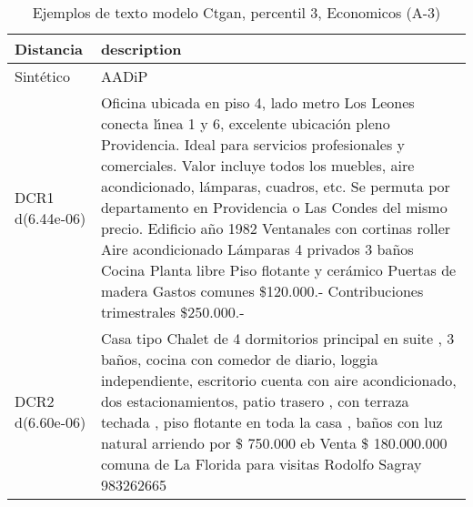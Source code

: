 \begin{table}[H]
\centering
\fontsize{10}{14}\selectfont
\caption{Ejemplos de texto modelo Ctgan, percentil 3, Economicos (A-3)}
\label{table-example-economicos-a-3-ctgan-3p-text}
\begin{tabular}{|l|m{35em}|}
\hline
\rowcolor[gray]{0.8}
Distancia & description \\
\hline Sintético & AADiP \\
\hline DCR1 d(6.44e-06) & Oficina ubicada en piso 4, lado metro Los Leones conecta l{\'\i}nea 1 y 6, excelente ubicaci\'on pleno Providencia. Ideal para servicios profesionales y comerciales. Valor incluye todos los muebles, aire acondicionado, l\'amparas, cuadros, etc.  Se permuta por departamento en Providencia o Las Condes del mismo precio.  Edificio a\~no 1982 Ventanales con cortinas roller Aire acondicionado L\'amparas 4 privados 3 ba\~nos Cocina Planta libre Piso flotante y cer\'amico Puertas de madera Gastos comunes \$120.000.- Contribuciones trimestrales \$250.000.- \\
\hline DCR2 d(6.60e-06) & Casa tipo Chalet de 4 dormitorios principal en suite , 3 ba\~nos, cocina con comedor de diario, loggia independiente, escritorio cuenta con aire acondicionado, dos estacionamientos, patio trasero , con terraza techada , piso flotante en toda la casa , ba\~nos con luz natural arriendo por \$ 750.000 eb Venta \$ 180.000.000 comuna de La Florida para visitas Rodolfo Sagray 983262665 \\
\hline
\end{tabular}
\end{table}
